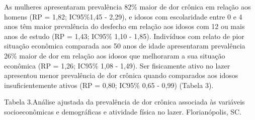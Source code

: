 \documentclass{article}
\begin{document}
As mulheres apresentaram prevalência 82\% maior de dor crônica em relação aos
homens (RP = 1,82; IC95\%1,45 - 2,29), e idosos com escolaridade entre 0 e 4
anos têm maior prevalência do desfecho em relação aos idosos com 12 ou mais anos
de estudo (RP = 1,43; IC95\% 1,10 - 1,85). Indivíduos com relato de pior
situação econômica comparada aos 50 anos de idade apresentaram prevalência 26\%
maior de dor em relação aos idosos que melhoraram a sua situação econômica (RP =
1,26; IC95\% 1,08 - 1,49). Ser fisicamente ativo no lazer apresentou menor
prevalência de dor crônica quando comparados aos idosos insuficientemente ativos
(RP = 0,80; IC95\% 0,65 - 0,99) (Tabela 3).

Tabela 3.Análise ajustada da prevalência de dor crônica associada às variáveis
socioeconômicas e demográficas e atividade física no lazer. Florianópolis, SC.
\end{document}
